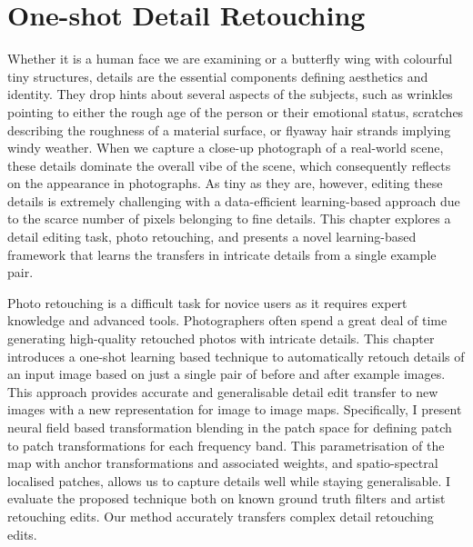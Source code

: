 \chapter{One-shot Detail Retouching}\label{one-shot}

Whether it is a human face we are examining or a butterfly wing with colourful tiny structures, details are the essential components defining aesthetics and identity. They drop hints about several aspects of the subjects, such as wrinkles pointing to either the rough age of the person or their emotional status, scratches describing the roughness of a material surface, or flyaway hair strands implying windy weather. When we capture a close-up photograph of a real-world scene, these details dominate the overall vibe of the scene, which consequently reflects on the appearance in photographs. As tiny as they are, however, editing these details is extremely challenging with a data-efficient learning-based approach due to the scarce number of pixels belonging to fine details. This chapter explores a detail editing task, photo retouching, and presents a novel learning-based framework that learns the transfers in intricate details from a single example pair.

Photo retouching is a difficult task for novice users as it requires expert knowledge and advanced tools. Photographers often spend a great deal of time generating high-quality retouched photos with intricate details. This chapter introduces a one-shot learning based technique to automatically retouch details of an input image based on just a single pair of before and after example images. This approach provides accurate and generalisable detail edit transfer to new images with a new representation for image to image maps. Specifically, I present neural field based transformation blending in the patch space for defining patch to patch transformations for each frequency band. This parametrisation of the map with anchor transformations and associated weights, and spatio-spectral localised patches, allows us to capture details well while staying generalisable. I evaluate the proposed technique both on known ground truth filters and artist retouching edits. Our method accurately transfers complex detail retouching edits.

